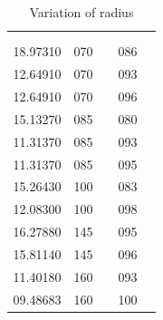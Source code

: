 \documentclass[blue]{beamer}
\begin{document}
\begin{frame}
\begin{columns}
{\begin{table}[H]
\begin{tabular}{||l|c|c|c|c||}
   \end{tabular}
   \end{table}
   }
    \begin{table}[H]
   \caption{Variation of radius}
  \begin{tabular}{||l|c|c|c|c||} \hline
   {\color{red}{Radius}} & {\color{red}{K}} & {\color{red}{actual K}} & {\color{red}{red points}} \\
   & & &   {\color{red}{covered}} \\ \hline
   18.97310 & 070 & {\color{blue}{40}} & 086 \\ \hline
   12.64910 & 070 & {\color{blue}{40}} & 093 \\ \hline
   12.64910 & 070 & {\color{blue}{40}} & 096 \\ \hline \hline 
   15.13270 & 085 & {\color{blue}{44}} & 080 \\ \hline 
   11.31370 & 085 & {\color{blue}{44}} & 093 \\ \hline 
   11.31370 & 085 & {\color{blue}{44}} & 095 \\ \hline \hline 
   15.26430 & 100 & {\color{blue}{46}} & 083 \\ \hline 
   12.08300 & 100 & {\color{blue}{46}} & 098 \\ \hline \hline 
   16.27880 & 145 & {\color{blue}{53}} & 095 \\ \hline 
   15.81140 & 145 & {\color{blue}{53}} & 096 \\ \hline \hline 
   11.40180 & 160 & {\color{blue}{55}} & 093 \\ \hline 
   09.48683 & 160 & {\color{blue}{55}} & 100 \\ \hline \hline 
   \end{tabular}
   \end{table}
   \end{columns}
\end{frame}
\end{document}
